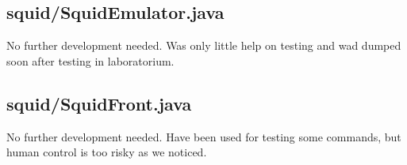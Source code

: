\subsection{squid/SquidEmulator.java}

No further development needed. Was only little help on testing and wad dumped soon after testing in laboratorium.

\subsection{squid/SquidFront.java}

No further development needed. Have been used for testing some commands, but human control is too risky as we noticed.
